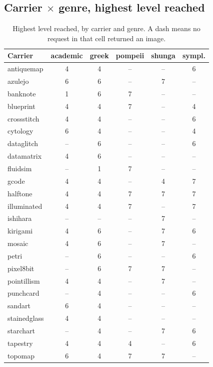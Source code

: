 \subsection{Carrier $\times$ genre, highest level reached}

\begin{table}[H]
\centering\scriptsize
\begin{tabular}{@{}lccccc@{}}
\toprule
Carrier & academic & greek & pompeii & shunga & sympl. \\
\midrule
antiquemap    & 4 & 4 & -- & -- & 6 \\
azulejo       & 6 & 6 & -- & 7 & -- \\
banknote      & 1 & 6 & 7 & -- & -- \\
blueprint     & 4 & 4 & 7 & -- & 4 \\
crossstitch   & 4 & 4 & -- & -- & 6 \\
cytology      & 6 & 4 & -- & -- & 4 \\
dataglitch    & -- & 6 & -- & -- & 6 \\
datamatrix    & 4 & 6 & -- & -- & -- \\
fluidsim      & -- & 1 & 7 & -- & -- \\
gcode         & 4 & 4 & -- & 4 & 7 \\
halftone      & 4 & 4 & 7 & 7 & 7 \\
illuminated   & 4 & 4 & 7 & -- & 7 \\
ishihara      & -- & -- & -- & 7 & -- \\
kirigami      & 4 & 6 & -- & 7 & 6 \\
mosaic        & 4 & 6 & -- & 7 & -- \\
petri         & -- & 6 & -- & -- & 6 \\
pixel8bit     & -- & 6 & 7 & 7 & -- \\
pointillism   & 4 & 4 & -- & 7 & -- \\
punchcard     & -- & 4 & -- & -- & 6 \\
sandart       & 6 & 4 & -- & -- & -- \\
stainedglass  & 4 & 4 & -- & -- & -- \\
starchart     & -- & 4 & -- & 7 & 6 \\
tapestry      & 4 & 4 & 4 & -- & 6 \\
topomap       & 6 & 4 & 7 & 7 & -- \\
\bottomrule
\end{tabular}
\caption{Highest \sexl{} level reached, by carrier and genre. A dash means no
request in that cell returned an image.}
\label{tab:matrix}
\end{table}

